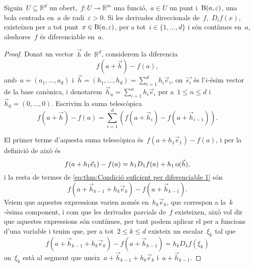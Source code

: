 \documentclass[../../main.tex]{subfiles}
\begin{document}
    \begin{theorem}
        \label{thm:Condició suficient per diferenciable}
        Siguin~\(U\subseteq\mathbb{R}^{d}\) un obert,~\(f\colon U\to\mathbb{R}^{m}\) una funció,~\(a\in U\) un punt i~\(\operatorname{B}(a,\varepsilon)\), una bola centrada en~\(a\) de radi~\(\varepsilon>0\).
        Si les derivades direccionals de~\(f\),~\(D_{i}f(x)\), existeixen per a tot punt~\(x\in\operatorname{B}(a,\varepsilon)\), per a tot~\( i\in\{1,\dots,d\}\) i són contínues en~\(a\), aleshores~\(f\) és diferenciable en~\(a\).
        \begin{proof}
            Donat un vector~\(\vec{h}\) de~\(\mathbb{R}^{d}\), considerem la diferencia
            \[
                f(a+\vec{h})-f(a),
            \]
            amb~\(a=(a_{1},\dots,a_{d})\) i~\(\vec{h}=(h_{1},\dots,h_{d})=\sum_{i=1}^{d}h_{i}\vec{e}_{i}\), on~\(\vec{e_{i}}\) és l'\(i\)-èsim vector de la base canònica, i denotarem~\(\vec{h}_{n}=\sum_{i=1}^{n}h_{i}\vec{e}_{i}\) per a~\(1\leq n\leq d\) i~\(\vec{h}_{0}=(0,\dots,0)\).
            Escrivim la suma telescòpica
            \begin{equation}\label{eq:thm:Condició suficient per diferenciable 1}
            f(a+\vec{h})-f(a)=\sum_{i=1}^{d}\left(f(a+\vec{h}_{i})-f(a+\vec{h}_{i-1})\right).
            \end{equation}

            El primer terme d'aquesta suma telescòpica és~\(f(a+h_{1}\vec{e}_{1})-f(a)\), i per la definició de  això és
            \[
                f(a+h_{1}\vec{e}_{1})-f(a)=h_{1}D_{1}f(a)+h_{1}\operatorname{o}(\vec{h}),
            \]
            i la resta de termes de \eqref{eq:thm:Condició suficient per diferenciable 1} són
            \[
                f(a+\vec{h}_{k-1}+h_{k}\vec{e}_{k})-f(a+\vec{h}_{k-1}).
            \]
            Veiem que aquestes expressions varien només en~\(h_{k}\vec{e}_{k}\), que correspon a la~\(k\)-èsima component, i com que les derivades parcials de~\(f\) existeixen, això vol dir que aquestes expressions són contínues, per tant podem aplicar el  per a funcions d'una variable i tenim que, per a tot~\(2\leq k\leq d\) existeix un escalar~\(\xi_{k}\) tal que
            \[
                f(a+\vec{h}_{k-1}+h_{k}\vec{e}_{k})-f(a+\vec{h}_{k-1})=h_{k}D_{k}f(\xi_{k})
            \]
            on~\(\xi_{k}\) està al segment que uneix~\(a+\vec{h}_{k-1}+h_{k}\vec{e}_{k}\) i~\(a+\vec{h}_{k-1}\).


\end{proof}
\end{theorem}
\end{document}
